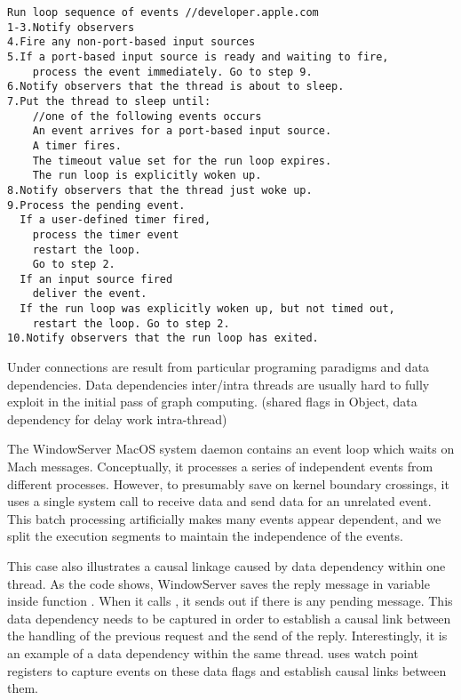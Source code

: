 {\footnotesize \begin{verbatim}
Run loop sequence of events //developer.apple.com
1-3.Notify observers
4.Fire any non-port-based input sources
5.If a port-based input source is ready and waiting to fire,
    process the event immediately. Go to step 9.
6.Notify observers that the thread is about to sleep.
7.Put the thread to sleep until:
    //one of the following events occurs
    An event arrives for a port-based input source.
    A timer fires.
    The timeout value set for the run loop expires.
    The run loop is explicitly woken up.
8.Notify observers that the thread just woke up.
9.Process the pending event.
  If a user-defined timer fired,
    process the timer event
    restart the loop.
    Go to step 2.
  If an input source fired
    deliver the event.
  If the run loop was explicitly woken up, but not timed out,
    restart the loop. Go to step 2.
10.Notify observers that the run loop has exited.

\end{verbatim}
}

Under connections are result from particular programing paradigms and data
dependencies. Data dependencies inter/intra threads are usually hard to fully
exploit in the initial pass of graph computing. (shared flags in Object, data
dependency for delay work intra-thread)

The WindowServer MacOS system daemon contains an event loop which waits on Mach
messages. Conceptually, it processes a series of independent events from
different processes. However, to presumably save on kernel boundary crossings,
it uses a single system call to receive data and send data for an unrelated
event. This batch processing artificially makes many events appear dependent,
and we split the execution segments to maintain the independence of the events.

This case also illustrates a causal linkage caused by data dependency within
one thread.  As the code shows, WindowServer saves the reply message in
variable  inside function .  When it calls
, it sends out  if there is any pending
message.  This data dependency needs to be captured in order to establish a
causal link between the handling of the previous request and the send of the
reply.  Interestingly, it is an example of a data dependency within the same
thread.  \xxx uses watch point registers to capture events on these data flags
and establish causal links between them.

